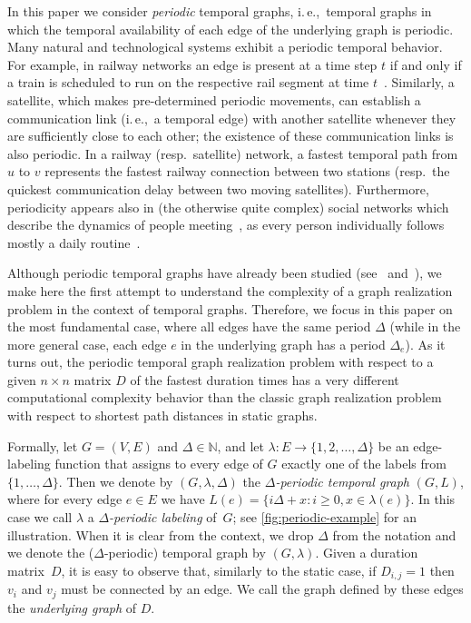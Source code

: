 \documentclass[a4paper,UKenglish,cleveref, autoref, thm-restate, anonymous]{lipics-v2021}
\newcommand{\ie}{i.\,e.,\ }
\begin{document}
In this paper we consider \emph{periodic} temporal graphs, \ie temporal graphs in which the temporal availability of each edge of the underlying graph is periodic. 
Many natural and technological systems exhibit a periodic temporal behavior. For example, in railway networks an edge is present at a time step $t$ if and
only if a train is scheduled to run on the respective rail segment at time $t$~\cite{Arrighi2023Multi}. 
Similarly, a satellite, which makes pre-determined periodic movements, can establish a communication link (\ie a temporal edge) with another satellite whenever they are sufficiently close to each other; the existence of these communication links is also periodic. 
In a railway (resp.~satellite) network, a fastest temporal path from $u$ to $v$ represents the fastest railway connection between two stations 
(resp.~the quickest communication delay between two moving satellites). 
Furthermore, periodicity appears also in (the otherwise quite complex) social networks which describe the dynamics of people meeting~\cite{snapnets,sapiezynski2015tracking}, as every person individually follows mostly a daily routine~\cite{Arrighi2023Multi}. 


Although periodic temporal graphs have already been studied 
(see~\cite[Class 8]{casteigts2012time} and~\cite{Arrighi2023Multi,ErlebachS20,morawietz2021timecop,morawietz2020timecop}), 
we make here the first attempt to understand the complexity of a graph realization problem in the context of temporal graphs. 
Therefore, we focus in this paper on the most fundamental case, where all edges have the same period $\Delta$ 
(while in the more general case, each edge $e$ in the underlying graph has a period $\Delta_e$).
As it turns out, the periodic temporal graph realization problem with respect to a given $n \times n$ matrix $D$ of the fastest duration times has a very different computational complexity behavior than the classic graph realization problem with respect to shortest path distances in static graphs. 








Formally, let $G=(V,E)$ and $\Delta\in \mathbb{N}$, and let $\lambda: E \rightarrow \{1,2,\ldots,\Delta\}$ be an edge-labeling function that assigns to every edge of $G$ exactly one of the labels from $\{1,\ldots,\Delta\}$. 
Then we denote by $(G,\lambda,\Delta)$ the \emph{$\Delta$-periodic temporal graph} $(G,L)$, where for every edge $e\in E$ we have $L(e)=\{i\Delta + x : i\geq 0, x\in \lambda(e)\}$. 
In this case we call $\lambda$ a \emph{$\Delta$-periodic labeling} of~$G$; see \cref{fig:periodic-example} for an illustration. 
When it is clear from the context, we drop $\Delta$ from the notation and 
we denote the ($\Delta$-periodic) temporal graph by $(G,\lambda)$.
Given a duration matrix~$D$, it is easy to observe that, similarly to the static case, if $D_{i,j}=1$ then $v_i$ and $v_j$ must be connected by an edge. We call the graph defined by these edges the \emph{underlying graph} of $D$.
\end{document}
